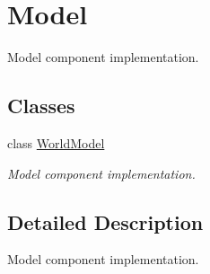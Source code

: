 \hypertarget{group__model}{}\section{Model}
\label{group__model}


Model component implementation.  


\subsection*{Classes}
\begin{DoxyCompactItemize}
\item 
class \hyperlink{classWorldModel}{World\+Model}
\begin{DoxyCompactList}\small\item\em Model component implementation. \end{DoxyCompactList}\end{DoxyCompactItemize}


\subsection{Detailed Description}
Model component implementation. 

